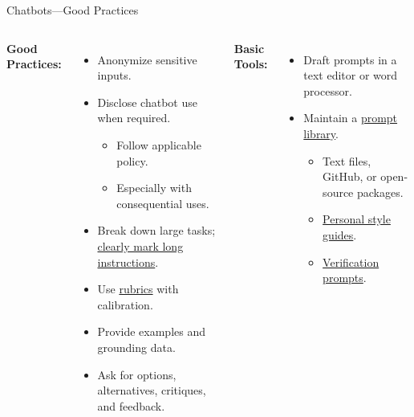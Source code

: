 \documentclass[aspectratio=169]{beamer}
\begin{document}
\begin{frame}[t]{Chatbots—Good Practices}
\small
\setlength{\leftmargini}{1.2em}
\setlength{\leftmarginii}{1.1em}

\begin{columns}[T,onlytextwidth]
    \textbf{Good Practices:}
    \begin{itemize}
        \setlength\itemsep{0.15em}
        \setlength\parskip{0pt}
        \setlength\parsep{0pt}
        \item Anonymize sensitive inputs.
        \item Disclose chatbot use when required.
        \begin{itemize}
            \setlength\itemsep{0.05em}
            \setlength\parskip{0pt}
            \setlength\parsep{0pt}
            \item Follow applicable policy.
            \item Especially with consequential uses.
        \end{itemize}
        \item Break down large tasks; \href{https://github.com/hallresearch-ai/basic-chatbot-guidance/blob/main/prompt-library/ai-guidance-proof.txt}{clearly mark long instructions}.
        \item Use \href{https://github.com/hallresearch-ai/basic-chatbot-guidance/blob/main/prompt-library/llm-as-a-judge-response-rubric.txt}{rubrics} with calibration.
        \item Provide examples and grounding data.
        \item Ask for options, alternatives, critiques, and feedback.
    \end{itemize}

    \textbf{Basic Tools:}
    \begin{itemize}
        \setlength\itemsep{0.15em}
        \setlength\parskip{0pt}
        \setlength\parsep{0pt}
        \item Draft prompts in a text editor or word processor.
        \item Maintain a \href{https://github.com/hallresearch-ai/basic-chatbot-guidance/tree/main/prompt-library}{prompt library}.
        \begin{itemize}
            \setlength\itemsep{0.05em}
            \setlength\parskip{0pt}
            \setlength\parsep{0pt}
            \item Text files, GitHub, or open-source packages.
            \item \href{https://github.com/hallresearch-ai/basic-chatbot-guidance/blob/main/prompt-library/natural-style-guide.txt}{Personal style guides}.
            \item \href{https://github.com/hallresearch-ai/basic-chatbot-guidance/blob/main/prompt-library/short-doc-proof.txt}{Verification prompts}.
        \end{itemize}
    \end{itemize}
\end{columns}
\end{frame}
\end{document}
